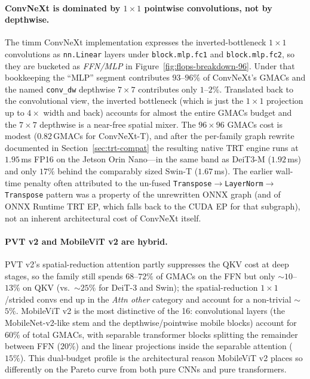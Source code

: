 \documentclass[runningheads,a4paper]{llncs}
\begin{document}
\paragraph{ConvNeXt is dominated by $1\times1$ pointwise convolutions, not by depthwise.}
The timm ConvNeXt implementation expresses the inverted-bottleneck $1\times1$ convolutions as \texttt{nn.Linear} layers under \texttt{block.mlp.fc1} and \texttt{block.mlp.fc2}, so they are bucketed as \emph{FFN/MLP} in Figure~\ref{fig:flops-breakdown-96}. Under that bookkeeping the ``MLP'' segment contributes $93$--$96\%$ of ConvNeXt's GMACs and the named \texttt{conv\_dw} depthwise $7\times7$ contributes only $1$--$2\%$. Translated back to the convolutional view, the inverted bottleneck (which is just the $1\times1$ projection up to $4\times$ width and back) accounts for almost the entire GMACs budget and the $7\times7$ depthwise is a near-free spatial mixer. The $96\times96$ GMACs cost is modest ($0.82$\,GMACs for ConvNeXt-T), and after the per-family graph rewrite documented in Section~\ref{sec:trt-compat} the resulting native TRT engine runs at $1.95$\,ms FP16 on the Jetson Orin Nano---in the same band as DeiT3-M ($1.92$\,ms) and only $17\%$ behind the comparably sized Swin-T ($1.67$\,ms). The earlier wall-time penalty often attributed to the un-fused \texttt{Transpose$\to$LayerNorm$\to$Transpose} pattern was a property of the unrewritten ONNX graph (and of ONNX Runtime TRT EP, which falls back to the CUDA EP for that subgraph), not an inherent architectural cost of ConvNeXt itself.

\paragraph{PVT v2 and MobileViT v2 are hybrid.}
PVT v2's spatial-reduction attention partly suppresses the QKV cost at deep stages, so the family still spends $68$--$72\%$ of GMACs on the FFN but only $\sim$$10$--$13\%$ on QKV (vs.\ $\sim$$25\%$ for DeiT-3 and Swin); the spatial-reduction $1\times1$/strided convs end up in the \emph{Attn other} category and account for a non-trivial $\sim$$5\%$. MobileViT v2 is the most distinctive of the 16: convolutional layers (the MobileNet-v2-like stem and the depthwise/pointwise mobile blocks) account for $60\%$ of total GMACs, with separable transformer blocks splitting the remainder between FFN ($20\%$) and the linear projections inside the separable attention ($15\%$). This dual-budget profile is the architectural reason MobileViT v2 places so differently on the Pareto curve from both pure CNNs and pure transformers.
\end{document}
